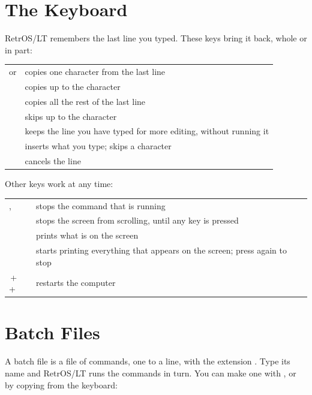 \section{The Keyboard}

RetrOS/LT remembers the last line you typed. These keys bring it back,
whole or in part:

\begin{tabularx}{\textwidth}{@{}P{1.1in}X@{}}
\toprule
{} or \key{$\rightarrow$} & copies one character from the last line\\
  & copies up to the character \\
 & copies all the rest of the last line\\
  & skips up to the character \\
 & keeps the line you have typed for more editing, without running it\\
 & inserts what you type;  skips a character\\
 & cancels the line\\
\bottomrule
\end{tabularx}

Other keys work at any time:

\begin{tabularx}{\textwidth}{@{}P{1.6in}X@{}}
\toprule
{},  & stops the command that is running\\
 & stops the screen from scrolling, until any key is pressed\\
 & prints what is on the screen\\
 & starts printing everything that appears on the screen; press again to stop\\
\,+\,\,+\, & restarts the computer\\
\bottomrule
\end{tabularx}

\section{Batch Files}

A batch file is a file of commands, one to a line, with the extension
. Type its name and RetrOS/LT runs the commands in turn. You
can make one with , or by copying from the keyboard:

